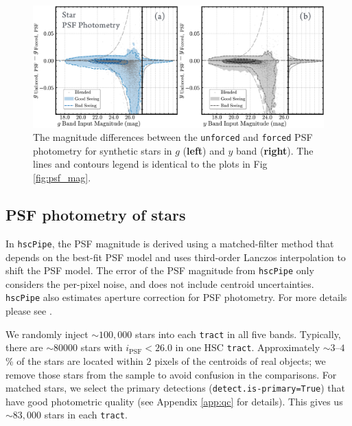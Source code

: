 \documentclass[useamsfonts]{pasj01}
\def\hscpipe{\texttt{hscPipe}}
\def\forced{\texttt{forced}}
\def\unforced{\texttt{unforced}}
\def\tract{\texttt{tract}}
\begin{document}
\begin{figure}
    \begin{center}
        \includegraphics[width=\textwidth]{fig/synpipe_psf_diff}
    \end{center}
    \caption{
        The magnitude differences between the \unforced{} and \forced{}
        PSF photometry for synthetic stars in $g$ (\textbf{left}) and $y$ band
        (\textbf{right}).
        The lines and contours legend is identical to the plots in Fig \ref{fig:psf_mag}.
        }
    \label{fig:psf_diff}
\end{figure}

\subsection{PSF photometry of stars}
    \label{ssec:psf}

    In \hscpipe{}, the PSF magnitude is derived using a matched-filter method that
    depends on the best-fit PSF model and uses third-order Lanczos interpolation to 
    shift the PSF model.
    The error of the PSF magnitude from \hscpipe{} only considers the per-pixel noise,
    and does not include centroid uncertainties.
    \hscpipe{} also estimates aperture correction for PSF photometry.
    For more details please see \citet{Bosch2017}.

    We randomly inject ${\sim}100,000$ stars into each \tract{} in all five bands. 
    Typically, there are ${\sim}80000$ stars with $i_{\mathrm{PSF}}<26.0$ in one HSC 
    \tract{}. 
    Approximately ${\sim}3$--$4$\% of the stars are located within 2 pixels of the 
    centroids of real objects; we remove those stars from the sample to avoid
    confusion in the comparisons.
    For matched stars, we select the primary detections 
    (\texttt{detect.is-primary=True}) that have good photometric quality
    (see Appendix \ref{app:qc} for details).
    This gives us ${\sim}83,000$ stars in each \tract{}.
\end{document}
